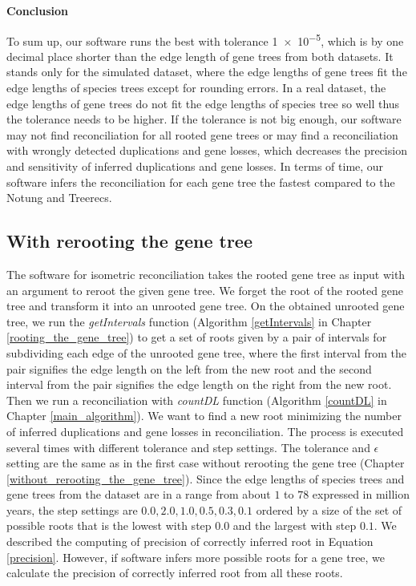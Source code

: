 \noindent \textbf{Conclusion}

To sum up, our software runs the best with tolerance \num {1e-5}, which is by one decimal place shorter than the edge length of gene trees from both datasets. It stands only for the simulated dataset, where the edge lengths of gene trees fit the edge lengths of species trees except for rounding errors. In a real dataset, the edge lengths of gene trees do not fit the edge lengths of species tree so well thus the tolerance needs to be higher. If the tolerance is not big enough, our software may not find reconciliation for all rooted gene trees or may find a reconciliation with wrongly detected duplications and gene losses, which decreases the precision and sensitivity of inferred duplications and gene losses. In terms of time, our software infers the reconciliation for each gene tree the fastest compared to the Notung and Treerecs.


\subsection{With rerooting the gene tree}

The software for isometric reconciliation takes the rooted gene tree as input with an argument to reroot the given gene tree. We forget the root of the rooted gene tree and transform it into an unrooted gene tree. On the obtained unrooted gene tree, we run the \emph{getIntervals} function (Algorithm \ref{getIntervals} in Chapter \ref{rooting_the_gene_tree}) to get a set of roots given by a pair of intervals for subdividing each edge of the unrooted gene tree, where the first interval from the pair signifies the edge length on the left from the new root and the second interval from the pair signifies the edge length on the right from the new root. Then we run a reconciliation with \emph{countDL} function (Algorithm \ref{countDL} in Chapter \ref{main_algorithm}). We want to find a new root minimizing the number of inferred duplications and gene losses in reconciliation. The process is executed several times with different tolerance and step settings. The tolerance and $\epsilon$ setting are the same as in the first case without rerooting the gene tree (Chapter \ref{without_rerooting_the_gene_tree}). Since the edge lengths of species trees and gene trees from the dataset are in a range from about $1$ to $78$ expressed in million years, the step settings are $0.0, 2.0, 1.0, 0.5, 0.3, 0.1$ ordered by a size of the set of possible roots that is the lowest with step $0.0$ and the largest with step $0.1$. We described the computing of precision of correctly inferred root in Equation \ref{precision}. However, if software infers more possible roots for a gene tree, we calculate the precision of correctly inferred root from all these roots.

